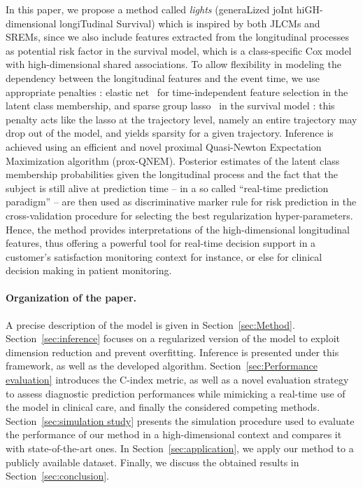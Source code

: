 \documentclass[11pt]{article}
\begin{document}
In this paper, we propose a method called \textit{lights} (generaLized joInt hiGH-dimensional longiTudinal Survival) which is inspired by both JLCMs and SREMs, since we also include features extracted from the longitudinal processes as potential risk factor in the survival model, which is a class-specific Cox model~\citep{Cox1972JRSS} with high-dimensional shared associations.
To allow flexibility in modeling the dependency between the longitudinal features and the event time, we use appropriate penalties : elastic net~\citep{zou2005regularization}
for time-independent feature selection in the latent class membership, and sparse group lasso~\citep{simon2013sparse} in the survival model : this penalty acts like the lasso at the trajectory level, namely an entire trajectory may drop out of the model, and yields sparsity for a given trajectory.
Inference is achieved using an efficient and novel proximal Quasi-Newton Expectation Maximization algorithm (prox-QNEM).
Posterior estimates of the latent class membership probabilities given the longitudinal process and the fact that the subject is still alive at prediction time -- in a so called ``real-time prediction paradigm'' -- are then used as discriminative marker rule for risk prediction in the cross-validation procedure for selecting the best regularization hyper-parameters.
Hence, the method provides interpretations of the high-dimensional longitudinal features, thus offering a powerful tool for real-time decision support in a customer's satisfaction monitoring context for instance, or else for clinical decision making in patient monitoring.

\paragraph{Organization of the paper.}

A precise description of the model is given in Section~\ref{sec:Method}.
Section~\ref{sec:inference} focuses on a regularized version of the
model to exploit dimension reduction and prevent overfitting. Inference is
presented under this framework, as well as the developed algorithm.
Section~\ref{sec:Performance evaluation} introduces the C-index metric, as well as a novel evaluation strategy to assess diagnostic prediction performances while mimicking a real-time use of the model in clinical care, and finally the considered competing methods.
Section~\ref{sec:simulation study} presents the simulation procedure used to evaluate the performance of our method in a high-dimensional context and compares it with state-of-the-art ones. In Section~\ref{sec:application}, we apply our method to a publicly available dataset. Finally, we discuss the obtained results in Section~\ref{sec:conclusion}.
\end{document}
